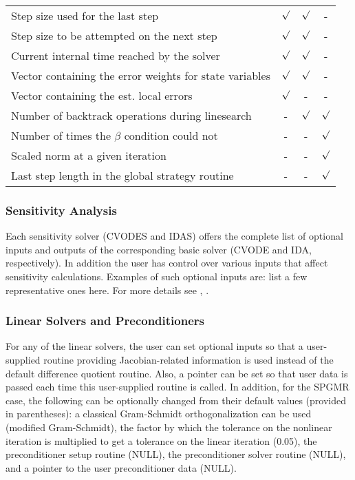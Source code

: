 \begin{table}[tp]
\begin{tabular}{|p{2.75in}|c|c|c|}
Step size used for the last step & $\surd$ & $\surd$ & - \\
Step size to be attempted on the next step & $\surd$ & $\surd$ & - \\
Current internal time reached by the solver & $\surd$ & $\surd$ & - \\
Vector containing the error weights for state variables & $\surd$ & $\surd$ & - \\
Vector containing the est. local errors & $\surd$ & - & - \\
Number of backtrack operations during linesearch & - & $\surd$ & $\surd$ \\
Number of times the $\beta$ condition could not & - & - & $\surd$ \\
Scaled norm at a given iteration & - & - & $\surd$ \\
Last step length in the global strategy routine & - & - & $\surd$ \\
\hline
\end{tabular}
\end{table}

\subsubsection*{Sensitivity Analysis}
Each sensitivity solver (CVODES and IDAS) offers the complete list
of optional inputs and outputs of the corresponding basic solver
(CVODE and IDA, respectively). In addition the user has control over
various inputs that affect sensitivity calculations. Examples of
such optional inputs are: {\sf list a few representative ones here}.
For more details see \cite{SeHi:03}, \cite{HiSe:02}.

\subsubsection*{Linear Solvers and Preconditioners}

For any of the linear solvers, the user can set optional inputs so 
that a user-supplied routine providing Jacobian-related information
is used instead of the default difference quotient routine. 
Also, a pointer can be set so that user data is passed each time this
user-supplied routine is called. In addition, for the SPGMR case,
the following can be optionally changed from their default values
(provided in parentheses): a classical Gram-Schmidt orthogonalization 
can be used (modified Gram-Schmidt), the factor by which the tolerance on the
nonlinear iteration is multiplied to get a tolerance on the linear
iteration (0.05), the preconditioner setup routine (NULL), the
preconditioner solver routine (NULL), and a pointer to the user
preconditioner data (NULL).

